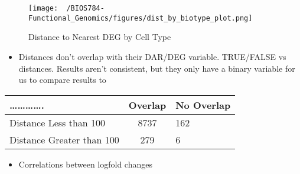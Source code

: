 \documentclass[
]{article}
\providecommand{\tightlist}{%
  \setlength{\itemsep}{0pt}\setlength{\parskip}{0pt}}
\begin{document}
\begin{figure}
\centering
\texttt{[image: ~/BIOS784-Functional\_Genomics/figures/dist\_by\_biotype\_plot.png]}
\caption{Distance to Nearest DEG by Cell Type}
\end{figure}

\begin{itemize}
\tightlist
\item
  Distances don't overlap with their DAR/DEG variable. TRUE/FALSE vs
  distances. Results aren't consistent, but they only have a binary
  variable for us to compare results to
\end{itemize}

\begin{longtable}[]{@{}lcl@{}}
\toprule\noalign{}
\ldots\ldots\ldots\ldots. & Overlap & No Overlap \\
\midrule\noalign{}
\endhead
\bottomrule\noalign{}
\endlastfoot
Distance Less than 100 & 8737 & 162 \\
Distance Greater than 100 & 279 & 6 \\
\end{longtable}

\begin{itemize}
\tightlist
\item
  Correlations between logfold changes
\end{itemize}
\end{document}
